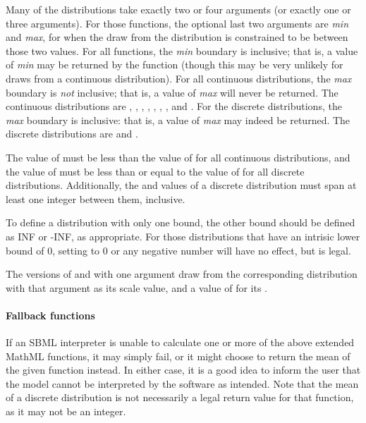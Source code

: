 \documentclass[draftspec]{sbmlpkgspec}
\newcommand{\mathml}{MathML\xspace}
\begin{document}
Many of the distributions take exactly two or four arguments (or exactly one or three arguments).  For those functions, the optional last two arguments are \textit{min} and \textit{max}, for when the draw from the distribution is constrained to be between those two values.  For all functions, the \textit{min} boundary is inclusive; that is, a value of \textit{min} may be returned by the function (though this may be very unlikely for draws from a continuous distribution).  For all continuous distributions, the \textit{max} boundary is \emph{not} inclusive; that is, a value of \textit{max} will never be returned.  The continuous distributions are , , , , , , , and .  For the discrete distributions, the \textit{max} boundary is inclusive: that is, a value of \textit{max} may indeed be returned.  The discrete distributions are  and .

The value of  must be less than the value of  for all continuous distributions, and the value of  must be less than or equal to the value of  for all discrete distributions.  Additionally, the  and  values of a discrete distribution must span at least one integer between them, inclusive.

To define a distribution with only one bound, the other bound should be defined as INF or -INF, as appropriate.  For those distributions that have an intrisic lower bound of 0, setting  to 0 or any negative number will have no effect, but is legal.

The versions of  and  with one argument draw from the corresponding distribution with that argument as its scale value, and a value of  for its .

\paragraph{Fallback functions}

If an SBML interpreter is unable to calculate one or more of the above extended \mathml functions, it may simply fail, or it might choose to return the mean of the given function instead.  In either case, it is a good idea to inform the user that the model cannot be interpreted by the software as intended. Note that the mean of a discrete distribution is not necessarily a legal return value for that function, as it may not be an integer.
\end{document}
